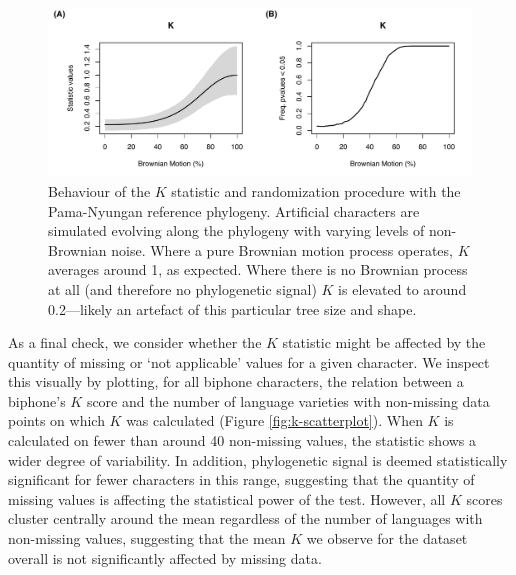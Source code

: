 \begin{figure}

{\centering \includegraphics[width=0.9\linewidth]{05-phylo-signal/fig/phylosim} 

}

\caption{Behaviour of the $K$ statistic and randomization procedure with the Pama-Nyungan reference phylogeny. Artificial characters are simulated evolving along the phylogeny with varying levels of non-Brownian noise. Where a pure Brownian motion process operates, $K$ averages around 1, as expected. Where there is no Brownian process at all (and therefore no phylogenetic signal) $K$ is elevated to around 0.2---likely an artefact of this particular tree size and shape.}\label{fig:k-simulation-plots}
\end{figure}

As a final check, we consider whether the \(K\) statistic might be affected by the quantity of missing or `not applicable' values for a given character. We inspect this visually by plotting, for all biphone characters, the relation between a biphone's \(K\) score and the number of language varieties with non-missing data points on which \(K\) was calculated (Figure \ref{fig:k-scatterplot}). When \(K\) is calculated on fewer than around 40 non-missing values, the statistic shows a wider degree of variability. In addition, phylogenetic signal is deemed statistically significant for fewer characters in this range, suggesting that the quantity of missing values is affecting the statistical power of the test. However, all \(K\) scores cluster centrally around the mean regardless of the number of languages with non-missing values, suggesting that the mean \(K\) we observe for the dataset overall is not significantly affected by missing data.


